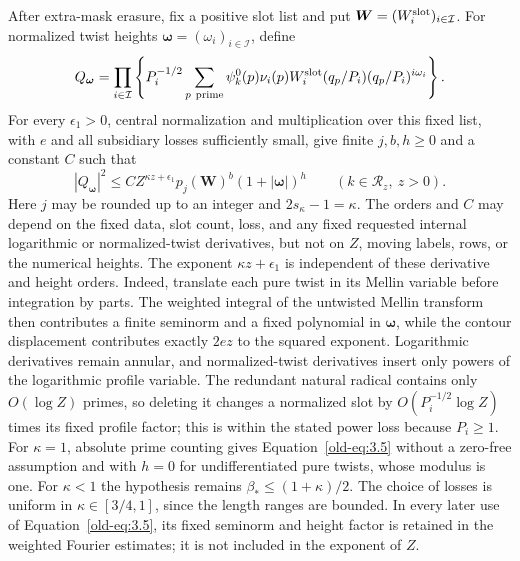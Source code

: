 \documentclass[11pt,a4paper]{article}
\numberwithin{equation}{section}
\numberwithin{figure}{section}
\theoremstyle{definition}
\theoremstyle{remark}
\begin{document}
After extra-mask erasure, fix a positive slot list and put
\(\boldsymbol W=(W_i^{\rm slot})_{i\in\mathcal I}\).  For normalized
twist heights \(\boldsymbol\omega=(\omega_i)_{i\in\mathcal I}\), define
\[
 Q_{\boldsymbol\omega}
 =\prod_{i\in\mathcal I}\left\{P_i^{-1/2}
   \sum_{p\ {\rm prime}}\psi_k^0(p)\nu_i(p)W_i^{\rm slot}(q_p/P_i)
                       (q_p/P_i)^{i\omega_i}\right\}.
\]
For every \(\epsilon_1>0\), central normalization and multiplication over this
fixed list, with \(e\) and all subsidiary losses sufficiently small,
give finite \(j,b,h\ge0\) and a constant \(C\) such that
\begin{equation}
 |Q_{\boldsymbol\omega}|^2
 \le C Z^{\kappa z+\epsilon_1}p_j(\boldsymbol W)^b
                 (1+|\boldsymbol\omega|)^h
 \qquad(k\in\mathcal R_z,\ z>0).
 \label{old-eq:3.5}
\end{equation}
Here \(j\) may be rounded up to an integer and \(2s_\kappa-1=\kappa\).
The orders and \(C\) may depend on the fixed data, slot count, loss,
and any fixed requested internal logarithmic or normalized-twist
derivatives, but not on \(Z\), moving labels, rows, or the numerical
heights.  The exponent \(\kappa z+\epsilon_1\) is independent of
these derivative and height orders.  Indeed, translate each pure twist
in its Mellin variable before integration by parts.  The weighted
integral of the untwisted Mellin transform then contributes a finite
seminorm and a fixed polynomial in \(\boldsymbol\omega\), while the
contour displacement contributes exactly \(2ez\) to the squared
exponent.  Logarithmic derivatives remain annular, and normalized-twist
derivatives insert only powers of the logarithmic profile variable.
The redundant natural radical contains
only \(O(\log Z)\) primes, so deleting it changes a normalized slot
by \(O(P_i^{-1/2}\log Z)\) times its fixed profile factor; this is
within the stated power loss because \(P_i\ge1\).  For \(\kappa=1\),
absolute prime counting gives Equation~\eqref{old-eq:3.5} without a
zero-free assumption and with \(h=0\) for undifferentiated pure twists,
whose modulus is one.  For \(\kappa<1\) the hypothesis remains
\(\beta_*\le(1+\kappa)/2\).  The choice of losses is uniform in
\(\kappa\in[3/4,1]\), since the length ranges are bounded.  In every
later use of Equation~\eqref{old-eq:3.5}, its fixed seminorm and height
factor is retained in the weighted Fourier estimates; it is not included
in the exponent of \(Z\).
\end{document}
